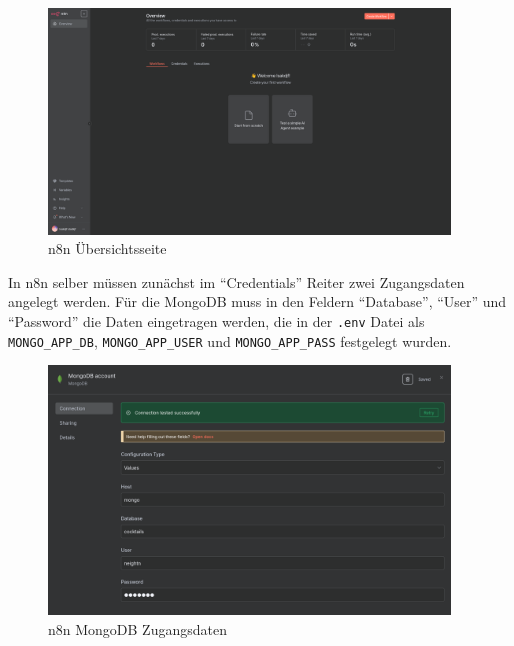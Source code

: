 \begin{figure}
    \begin{center}
        \includegraphics[width=0.95\textwidth]{images/n8n_overview.png}
    \end{center}
    \caption{n8n Übersichtsseite}\label{fig:n8n_overview}
\end{figure}

In n8n selber müssen zunächst im \enquote{Credentials} Reiter zwei Zugangsdaten angelegt werden. Für
die MongoDB muss in den Feldern \enquote{Database}, \enquote{User} und \enquote{Password} die Daten
eingetragen werden, die in der \verb|.env| Datei als \verb|MONGO_APP_DB|, \verb|MONGO_APP_USER| und
\verb|MONGO_APP_PASS| festgelegt wurden.

\begin{figure}
    \begin{center}
        \includegraphics[width=0.95\textwidth]{images/n8n_mongo_creds.png}
    \end{center}
    \caption{n8n MongoDB Zugangsdaten}\label{fig:n8n_mongo_creds}
\end{figure}

